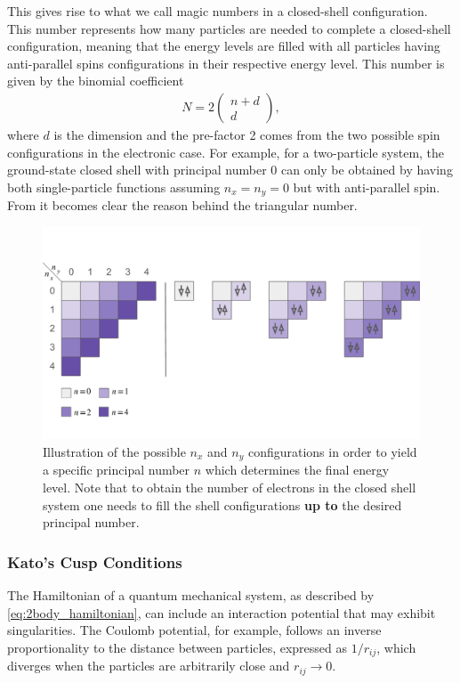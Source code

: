 This gives rise to what we call magic numbers in a closed-shell configuration. This number represents how many particles are needed to complete a closed-shell configuration, meaning that the energy levels are filled with all particles having anti-parallel spins configurations in their respective energy level. This number is given by the binomial coefficient
\begin{align*}
   N =  2\begin{pmatrix}
        n + d \\ 
        d
    \end{pmatrix},
\end{align*}
where $d$ is the dimension and the pre-factor 2 comes from the two possible spin configurations in the electronic case.
For example, for a two-particle system, the ground-state closed shell with principal number $0$ can only be obtained by having both single-particle functions assuming $n_x = n_y = 0$ but with anti-parallel spin. From  it becomes clear the reason behind the triangular number.

\begin{figure}[H]
    \centering
    \includegraphics[width=0.8\linewidth]{Chapters/Theoretical_Background/images/energy-levels.pdf}
    \caption{Illustration of the possible $n_x$ and $n_y$ configurations in order to yield a specific principal number $n$ which determines the final energy level. Note that to obtain the number of electrons in the closed shell system one needs to fill the shell configurations \textbf{up to} the desired principal number.}
    \label{fig:energy_levels_2d}
\end{figure}

\subsubsection{Kato's Cusp Conditions}\label{sec:kato}
The Hamiltonian of a quantum mechanical system, as described by \eqref{eq:2body_hamiltonian}, can include an interaction potential that may exhibit singularities. The Coulomb potential, for example, follows an inverse proportionality to the distance between particles, expressed as $1/r_{ij}$, which diverges when the particles are arbitrarily close and $r_{ij} \to 0$.


